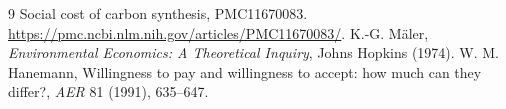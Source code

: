 \documentclass[11pt]{article}
\theoremstyle{definition}
\begin{document}
\begin{thebibliography}{9}
 Social cost of carbon synthesis, PMC11670083. \url{https://pmc.ncbi.nlm.nih.gov/articles/PMC11670083/}.
 K.-G. M\"aler, \emph{Environmental Economics: A Theoretical Inquiry}, Johns Hopkins (1974).
 W. M. Hanemann, Willingness to pay and willingness to accept: how much can they differ?, \emph{AER} 81 (1991), 635--647.
\end{thebibliography}
\end{document}
